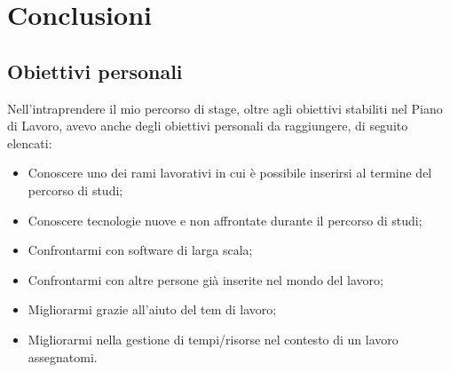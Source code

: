 
\chapter{Conclusioni}
\label{cap:conclusioni}

\section {Obiettivi personali}
Nell'intraprendere il mio percorso di stage, oltre agli obiettivi stabiliti nel Piano di Lavoro, avevo anche degli obiettivi personali da raggiungere, di seguito elencati:
\begin{itemize}
	\item Conoscere uno dei rami lavorativi in cui è possibile inserirsi al termine del percorso di studi;
	\item Conoscere tecnologie nuove e non affrontate durante il percorso di studi;
	\item Confrontarmi con software di larga scala;
	\item Confrontarmi con altre persone già inserite nel mondo del lavoro;
	\item Migliorarmi grazie all'aiuto del tem di lavoro;
	\item Migliorarmi nella gestione di tempi/risorse nel contesto di un lavoro assegnatomi.
\end{itemize}